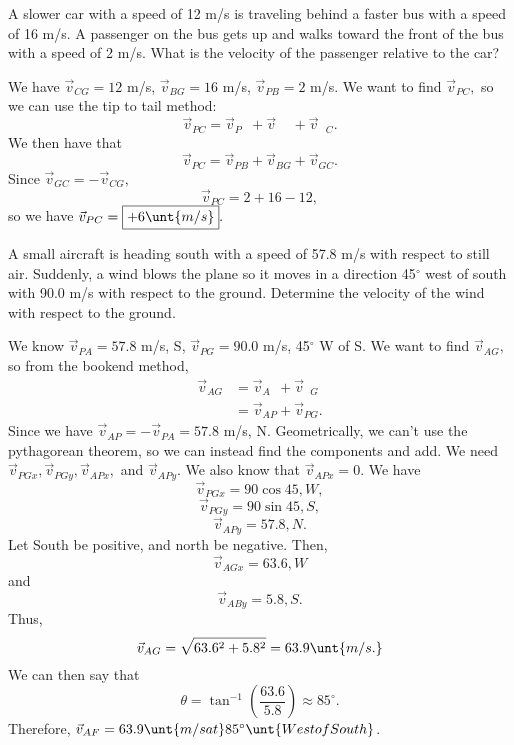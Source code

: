 \documentclass[11pt]{article}
\begin{document}
\begin{example}
	A slower car with a speed of 12 m/s is traveling behind a faster bus with a speed of 16 m/s. A passenger on the bus gets up and walks toward the front of the bus with a speed of 2 m/s. What is the velocity of the passenger relative to the car?
\end{example}
\begin{solution}
	We have $\vec{v}_{CG} = 12$ m/s, $\vec{v}_{BG} = 16$ m/s, $\vec{v}_{PB} = 2$ m/s. We want to find $\vec{v}_{PC},$ so we can use the tip to tail method:
	\[\vec{v}_{PC} = \vec{v}_{P\phantom{A}} + \vec{v}_{\phantom{AA}} + \vec{v}_{\phantom{A}C}.\]
	We then have that
	\[\vec{v}_{PC} = \vec{v}_{PB} + \vec{v}_{BG} + \vec{v}_{GC}.\]
	Since $\vec{v}_{GC} = -\vec{v}_{CG},$
	\[\vec{v}_{PC} = 2 + 16 - 12,\]
	so we have $\vec{v}_{PC} = \boxed{+6 \unt{m/s}}.$
\end{solution}

\begin{example}
	A small aircraft is heading south with a speed of 57.8 m/s with respect to still air. Suddenly, a wind blows the plane so it moves in a direction 45$^{\circ}$ west of south with 90.0 m/s with respect to the ground. Determine the velocity of the wind with respect to the ground.
\end{example}
\begin{solution}
	We know $\vec{v}_{PA} = 57.8$ m/s, S, $\vec{v}_{PG} = 90.0$ m/s, 45$^{\circ}$ W of S. We want to find $\vec{v}_{AG},$ so from the bookend method,
	\begin{align*}
		\vec{v}_{AG} &= \vec{v}_{A\phantom{P}} + \vec{v}_{\phantom{P}G} \\
		&= \vec{v}_{AP} + \vec{v}_{PG}.
	\end{align*}
	Since we have $\vec{v}_{AP} = -\vec{v}_{PA} = 57.8$ m/s, N. Geometrically, we can't use the pythagorean theorem, so we can instead find the components and add. We need $\vec{v}_{PGx}, \vec{v}_{PGy}, \vec{v}_{APx},$ and $\vec{v}_{APy}$. We also know that $\vec{v}_{APx} = 0$. We have
	\[\vec{v}_{PGx} = 90\cos45, W,\]
	\[\vec{v}_{PGy} = 90\sin45, S,\]
	\[\vec{v}_{APy} = 57.8, N.\]
	Let South be positive, and north be negative. Then,
	\[\vec{v}_{AGx} = 63.6, W\]
	and
	\[\vec{v}_{ABy} = 5.8, S.\]
	Thus,
	\[\vec{v}_{AG} = \sqrt{63.6^2 + 5.8^2} = 63.9 \unt{m/s.}\]
	We can then say that
	\[\theta = \tan^{-1}\left(\frac{63.6}{5.8}\right) \approx 85^{\circ}.\]
	Therefore, $\vec{v}_{AF} = 63.9\unt{m/s at }85^{\circ}\unt{West of South}$.
\end{solution}
\end{document}
